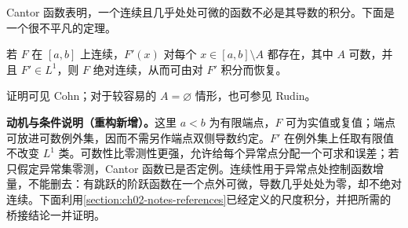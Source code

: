 \documentclass[../../main.tex]{subfiles}%
\begin{document}
Cantor 函数表明，一个连续且几乎处处可微的函数不必是其导数的积分。下面是一个很不平凡的定理。
\begin{theorem}\label{theorem:ch03-countable-exception-ftc}
若 $F$ 在 $[a,b]$ 上连续，$F'(x)$ 对每个 $x\in[a,b]\setminus A$ 都存在，其中 $A$ 可数，并且 $F'\in L^1$，则 $F$ 绝对连续，从而可由对 $F'$ 积分而恢复。
\end{theorem}
证明可见 Cohn\cite[\S6.3]{folland-bib-027}；对于较容易的 $A=\varnothing$ 情形，也可参见 Rudin\cite[定理 7.26]{folland-bib-125}。
\begin{remark}
\textbf{动机与条件说明（重构新增）。}这里 $a<b$ 为有限端点，$F$ 可为实值或复值；端点可放进可数例外集，因而不需另作端点双侧导数约定。$F'$ 在例外集上任取有限值不改变 $L^1$ 类。可数性比零测性更强，允许给每个异常点分配一个可求和误差；若只假定异常集零测，Cantor 函数已是否定例。连续性用于异常点处控制函数增量，不能删去：有跳跃的阶跃函数在一个点外可微，导数几乎处处为零，却不绝对连续。下面利用\cref{section:ch02-notes-references}已经定义的尺度积分，并把所需的桥接结论一并证明。
\end{remark}
\end{document}
